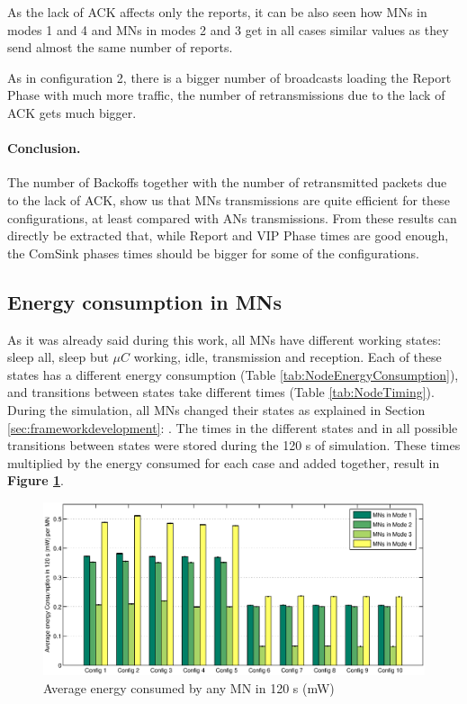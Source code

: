As the lack of \ac{ACK} affects only the reports, it can be also seen how \acp{MN} in modes 1 and 4 and \acp{MN} in modes 2 and 3 get in all cases similar
values as they send almost the same number of reports.

As in configuration 2, there is a bigger number of broadcasts loading the Report Phase with much more traffic, the number of retransmissions due to 
the lack of \ac{ACK} gets much bigger.

\paragraph{Conclusion.} The number of Backoffs together with the number of retransmitted packets due to the lack of ACK, show us that \acp{MN} transmissions 
are quite efficient for these configurations, at least compared with \acp{AN} transmissions. From these results can directly be extracted that, while 
Report and VIP Phase times are good enough, the ComSink phases times should be bigger for some of the configurations.

\subsection{Energy consumption in \acp{MN}}

As it was already said during this work, all \acp{MN} have different working states: sleep all, sleep but $\mu C$ working, idle, transmission and 
reception. Each of these states has a different energy consumption (Table \ref{tab:NodeEnergyConsumption}), and transitions between states take 
different times (Table \ref{tab:NodeTiming}). During the simulation, all \acp{MN} changed their states as explained in Section 
\ref{sec:frameworkdevelopment}: . The times in the different states and in all possible transitions between states were stored
during the 120 s of simulation. These times multiplied by the energy consumed for each case and added together, result in \textbf{Figure \ref{fig:energyConsumptionPerMN}}.

\begin{figure}[ht]
 \begin{center}
  \includegraphics[width=1\textwidth]{energyConsumptionPerMN.eps}
 \end{center}
 \caption{Average energy consumed by any \ac{MN} in 120 s (mW)}
 \label{fig:energyConsumptionPerMN}
\end{figure}

